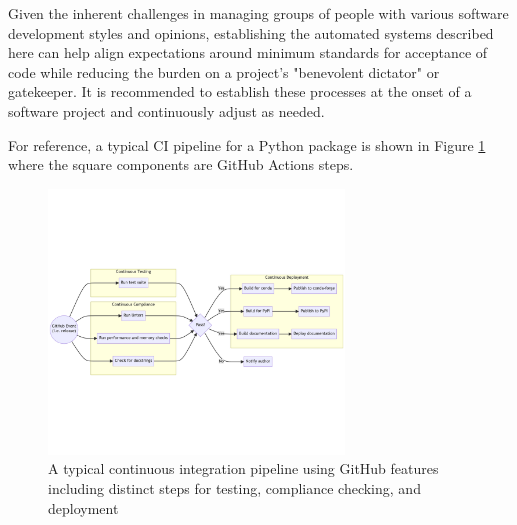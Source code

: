 \documentclass[]{nrel}
\begin{document}
Given the inherent challenges in managing groups of people with various software
development styles and opinions, establishing the automated systems described here
can help align expectations around minimum standards for acceptance of code while
reducing the burden on a project's "benevolent dictator" or gatekeeper.
It is recommended to establish these processes at the onset of a software project and
continuously adjust as needed.

For reference, a typical CI pipeline for a Python package is shown in Figure \ref{fig:ci_pipeline} where the square
components are GitHub Actions steps.

\begin{figure}[htbp]
\begin{center}
\includegraphics[width=0.7\textwidth]{mermaid-diagram-2023-10-02-133543.png}
\caption{A typical continuous integration pipeline using GitHub features including distinct steps for testing, compliance checking, and deployment}
\label{fig:ci_pipeline}
\end{center}
\end{figure}


\end{document}
